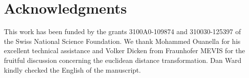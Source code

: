 \section{Acknowledgments}
This work has been funded by the grants 3100A0-109874 and 310030-125397 of the Swiss National Science Foundation. We thank Mo\-ham\-med Ouanella for his excellent technical assistance and Volker Dicken from Fraunhofer MEVIS for the fruitful discussion concerning the euclidean distance transformation. Dan Ward kindly checked the English of the manuscript.

